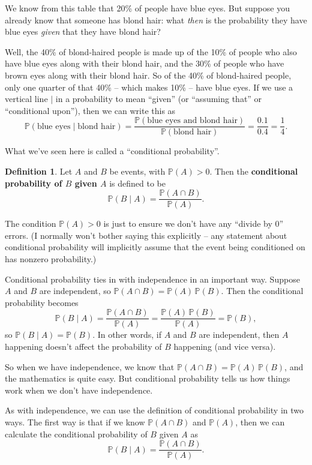 \documentclass[
  a4paper,
]{book}
\theoremstyle{definition}
\newtheorem{definition}{Definition}[chapter]
\theoremstyle{definition}
\theoremstyle{definition}
\theoremstyle{definition}
\theoremstyle{remark}
\begin{document}
We know from this table that 20\% of people have blue eyes. But suppose you already know that someone has blond hair: what \emph{then} is the probability they have blue eyes \emph{given} that they have blond hair?

Well, the 40\% of blond-haired people is made up of the 10\% of people who also have blue eyes along with their blond hair, and the 30\% of people who have brown eyes along with their blond hair. So of the 40\% of blond-haired people, only one quarter of that 40\% -- which makes 10\% -- have blue eyes. If we use a vertical line \(|\) in a probability to mean ``given'' (or ``assuming that'' or ``conditional upon''), then we can write this as
\[  \mathbb P(\text{blue eyes} \mid \text{blond hair}) = \frac{\mathbb P(\text{blue eyes and blond hair})}{\mathbb P(\text{blond hair})} = \frac{0.1}{0.4} = \frac14. \]

What we've seen here is called a ``conditional probability''.

\begin{definition}
Let \(A\) and \(B\) be events, with \(\mathbb P(A) > 0\). Then the \textbf{conditional probability of \(B\) given \(A\)} is defined to be
\[  \mathbb P(B \mid A) = \frac{\mathbb P(A \cap B)}{\mathbb P(A)} . \]
\end{definition}

The condition \(\mathbb P(A) > 0\) is just to ensure we don't have any ``divide by 0'' errors. (I normally won't bother saying this explicitly -- any statement about conditional probability will implicitly assume that the event being conditioned on has nonzero probability.)

Conditional probability ties in with independence in an important way. Suppose \(A\) and \(B\) are independent, so \(\mathbb P(A \cap B) = \mathbb P(A) \, \mathbb P(B)\). Then the conditional probability becomes
\[ \mathbb P(B \mid A) = \frac{\mathbb P(A \cap B)}{\mathbb P(A)} =  \frac{\mathbb P(A) \, \mathbb P(B)}{\mathbb P(A)} = \mathbb P(B) , \]
so \(\mathbb P(B \mid A) = \mathbb P(B)\). In other words, if \(A\) and \(B\) are independent, then \(A\) happening doesn't affect the probability of \(B\) happening (and vice versa).

So when we have independence, we know that \(\mathbb P(A \cap B) = \mathbb P(A)\,\mathbb P(B)\), and the mathematics is quite easy. But conditional probability tells us how things work when we don't have independence.

As with independence, we can use the definition of conditional probability in two ways. The first way is that if we know \(\mathbb P(A \cap B)\) and \(\mathbb P(A)\), then we can calculate the conditional probability of \(B\) given \(A\) as
\[  \mathbb P(B \mid A) = \frac{\mathbb P(A \cap B)}{\mathbb P(A)} . \]
\end{document}
